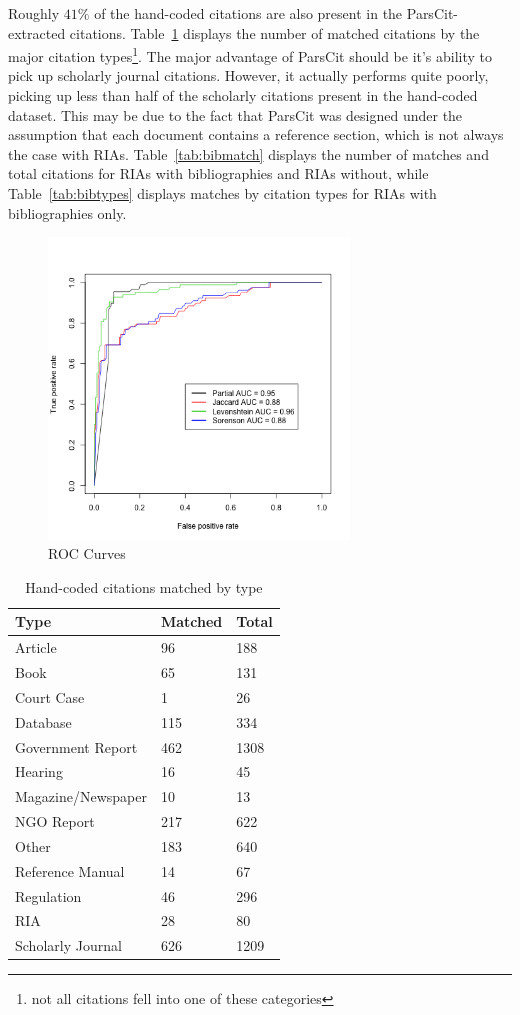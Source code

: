 \documentclass[12pt]{article}
\begin{document}
Roughly $41\%$ of the hand-coded citations are also present in the ParsCit-extracted citations. Table~\ref{tab:focalhand} displays the number of matched citations by the major citation types\footnote{not all citations fell into one of these categories}. The major advantage of ParsCit should be it's ability to pick up scholarly journal citations. However, it actually performs quite poorly, picking up less than half of the scholarly citations present in the hand-coded dataset. This may be due to the fact that ParsCit was designed under the assumption that each document contains a reference section, which is not always the case with RIAs. Table~\ref{tab:bibmatch} displays the number of matches and total citations for RIAs with bibliographies and RIAs without, while Table~\ref{tab:bibtypes} displays matches by citation types for RIAs with bibliographies only.

\begin{figure}
\begin{center}
\includegraphics[height=8cm]{roc_curves.png}
\caption{ROC Curves}
\label{fig:roc}
\end{center}
\end{figure}

\begin{table}[ht]
\centering
\caption{Hand-coded citations matched by type}\label{tab:focalhand}
\begin{tabular}{lll}
  \hline
  \hline
 Type & Matched & Total\\
 \hline
Article & 96 & 188 \\
Book & 65 & 131\\
Court Case & 1 & 26\\
Database & 115 & 334\\
Government Report & 462 & 1308\\
Hearing & 16 & 45\\
Magazine/Newspaper & 10 & 13\\
NGO Report & 217 & 622 \\
Other & 183 & 640\\
Reference Manual & 14 & 67\\
Regulation & 46 & 296\\
RIA & 28 & 80\\
Scholarly Journal & 626 & 1209\\
  \hline
  \hline
\end{tabular}
\end{table}
\end{document}
